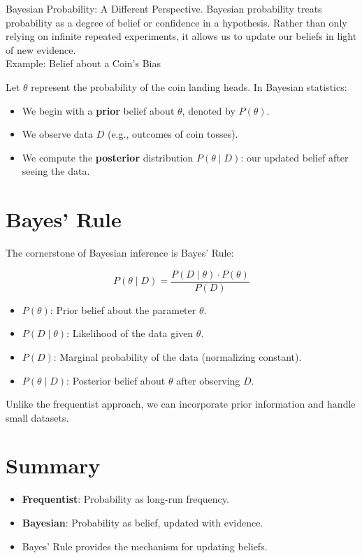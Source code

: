 \documentclass{book}
\begin{document}
Bayesian Probability: A Different Perspective. Bayesian probability treats probability as a degree of belief or confidence in a hypothesis. Rather than only relying on infinite repeated experiments, it allows us to update our beliefs in light of new evidence.\\

Example: Belief about a Coin's Bias

Let $\theta$ represent the probability of the coin landing heads. In Bayesian statistics:

\begin{itemize}
    \item We begin with a \textbf{prior} belief about $\theta$, denoted by $P(\theta)$.
    \item We observe data $D$ (e.g., outcomes of coin tosses).
    \item We compute the \textbf{posterior} distribution $P(\theta \mid D)$: our updated belief after seeing the data.
\end{itemize}

\section{Bayes' Rule}

The cornerstone of Bayesian inference is Bayes' Rule:

\[
P(\theta \mid D) = \frac{P(D \mid \theta) \cdot P(\theta)}{P(D)}
\]

\begin{itemize}
    \item $P(\theta)$: Prior belief about the parameter $\theta$.
    \item $P(D \mid \theta)$: Likelihood of the data given $\theta$.
    \item $P(D)$: Marginal probability of the data (normalizing constant).
    \item $P(\theta \mid D)$: Posterior belief about $\theta$ after observing $D$.
\end{itemize}

Unlike the frequentist approach, we can incorporate prior information and handle small datasets.

\section{Summary}

\begin{itemize}
    \item \textbf{Frequentist}: Probability as long-run frequency.
    \item \textbf{Bayesian}: Probability as belief, updated with evidence.
    \item Bayes’ Rule provides the mechanism for updating beliefs.
\end{itemize}
\end{document}
